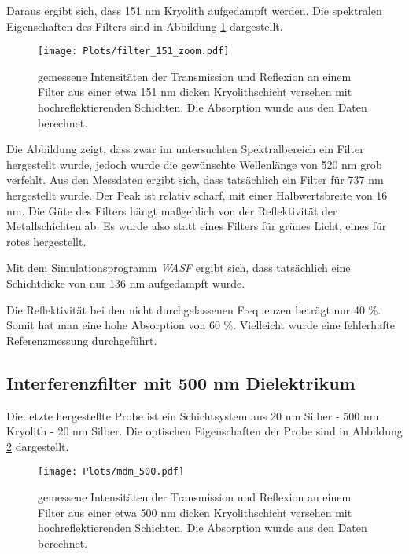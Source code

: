 \documentclass[10pt,twoside]{article}
\renewcommand{\1}{^{-1}}
\renewcommand{\2}{^{-2}}
\newcommand{\3}{^{-3}}
\newcommand{\4}{^{-4}}
\newcommand{\5}{^{-5}}
\newcommand{\6}{^{-6}}
\newcommand{\7}{^{-7}}
\newcommand{\8}{^{-8}}
\newcommand{\9}{^{-9}}
\begin{document}
Daraus ergibt sich, dass 151 nm Kryolith aufgedampft werden.
Die spektralen Eigenschaften des Filters sind in Abbildung \ref{fig:mdm_151} dargestellt.

\begin{figure}[h]
\centering
\texttt{[image: Plots/filter\_151\_zoom.pdf]} 
\caption{gemessene Intensitäten der Transmission und Reflexion an einem Filter aus einer etwa 151 nm dicken Kryolithschicht versehen mit hochreflektierenden Schichten. Die Absorption wurde aus den Daten berechnet.}
\label{fig:mdm_151}
\end{figure}

\newpage

Die Abbildung zeigt, dass zwar im untersuchten Spektralbereich ein Filter hergestellt wurde, jedoch wurde die gewünschte Wellenlänge von 520 nm grob verfehlt. 
Aus den Messdaten ergibt sich, dass tatsächlich ein Filter für 737 nm hergestellt wurde.
Der Peak ist relativ scharf, mit einer Halbwertsbreite von 16 nm. Die Güte des Filters hängt maßgeblich von der Reflektivität der Metallschichten ab.
Es wurde also statt eines Filters für grünes Licht, eines für rotes hergestellt.

Mit dem Simulationsprogramm \textit{WASF} ergibt sich, dass tatsächlich eine Schichtdicke von nur 136 nm aufgedampft wurde.

Die Reflektivität bei den nicht durchgelassenen Frequenzen beträgt nur 40 \%. Somit hat man eine hohe Absorption von 60 \%. Vielleicht wurde eine fehlerhafte Referenzmessung durchgeführt.


\subsection{Interferenzfilter mit 500 nm Dielektrikum}

Die letzte hergestellte Probe ist ein Schichtsystem aus 20 nm Silber - 500 nm Kryolith - 20 nm Silber.
Die optischen Eigenschaften der Probe sind in Abbildung \ref{fig:mdm_500} dargestellt.

\begin{figure}[h]
\centering
\texttt{[image: Plots/mdm\_500.pdf]} 
\caption{gemessene Intensitäten der Transmission und Reflexion an einem Filter aus einer etwa 500 nm dicken Kryolithschicht versehen mit hochreflektierenden Schichten. Die Absorption wurde aus den Daten berechnet.}
\label{fig:mdm_500}
\end{figure}
\end{document}
